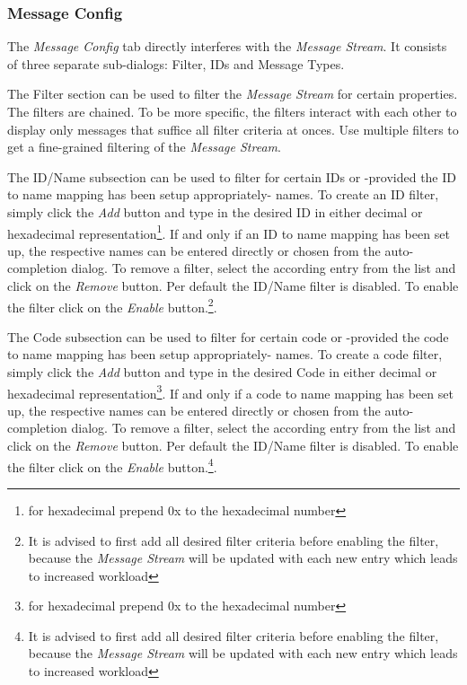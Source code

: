 \documentclass[12pt,a4paper]{scrartcl}
\begin{document}
\subsubsection{Message Config}
\label{subsubsec:GettingStartedOverviewMsgConfig}
The \textit{Message Config} tab directly interferes with the \textit{Message Stream}. It consists of three separate sub-dialogs: Filter, IDs and Message Types.

The Filter section can be used to filter the \textit{Message Stream} for certain properties. The filters are chained. To be more specific, the filters interact with each other to display only messages that suffice all filter criteria at onces. Use multiple filters to get a fine-grained filtering of the \textit{Message Stream}.

The ID/Name subsection can be used to filter for certain IDs or -provided the ID to name mapping has been setup appropriately- names. To create an ID filter, simply click the \textit{Add} button and type in the desired ID in either decimal or hexadecimal representation\footnote{for hexadecimal prepend 0x to the hexadecimal number}. If and only if an ID to name mapping has been set up, the respective names can be entered directly or chosen from the auto-completion dialog. To remove a filter, select the according entry from the list and click on the \textit{Remove} button. Per default the ID/Name filter is disabled. To enable the filter click on the \textit{Enable} button.\footnote{It is advised to first add all desired filter criteria before enabling the filter, because the \textit{Message Stream} will be updated with each new entry which leads to increased workload}.

The Code subsection can be used to filter for certain code or -provided the code to name mapping has been setup appropriately- names. To create a code filter, simply click the \textit{Add} button and type in the desired Code in either decimal or hexadecimal representation\footnote{for hexadecimal prepend 0x to the hexadecimal number}. If and only if a code to name mapping has been set up, the respective names can be entered directly or chosen from the auto-completion dialog. To remove a filter, select the according entry from the list and click on the \textit{Remove} button. Per default the ID/Name filter is disabled. To enable the filter click on the \textit{Enable} button.\footnote{It is advised to first add all desired filter criteria before enabling the filter, because the \textit{Message Stream} will be updated with each new entry which leads to increased workload}.
\end{document}
